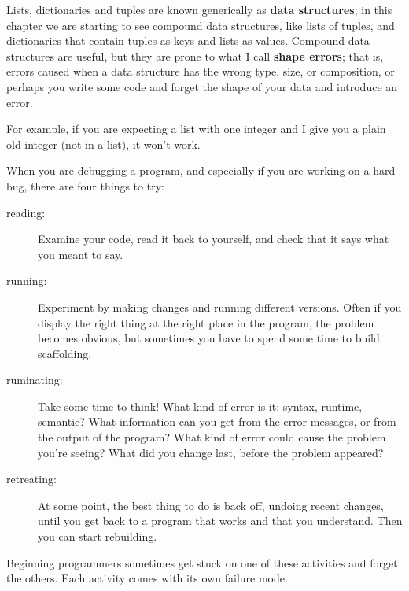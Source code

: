 
Lists, dictionaries and tuples are known generically as {\bf data
  structures}; in this chapter we are starting to see compound data
structures, like lists of tuples, and dictionaries that contain tuples
as keys and lists as values.  Compound data structures are useful, but
they are prone to what I call {\bf shape errors}; that is, errors
caused when a data structure has the wrong type, size, or composition,
or perhaps you write some code and forget the shape of your data
and introduce an error.

For example, if you are expecting a list with one integer and I
give you a plain old integer (not in a list), it won't work.

When you are debugging a program, and especially if you are
working on a hard bug, there are four things to try:

\begin{description}

\item[reading:] Examine your code, read it back to yourself, and
check that it says what you meant to say.

\item[running:] Experiment by making changes and running different
versions.  Often if you display the right thing at the right place
in the program, the problem becomes obvious, but sometimes you have to
spend some time to build scaffolding.

\item[ruminating:] Take some time to think!  What kind of error
is it: syntax, runtime, semantic?  What information can you get from
the error messages, or from the output of the program?  What kind of
error could cause the problem you're seeing?  What did you change
last, before the problem appeared?

\item[retreating:] At some point, the best thing to do is back
off, undoing recent changes, until you get back to a program that
works and that you understand.  Then you can start rebuilding.

\end{description}

Beginning programmers sometimes get stuck on one of these activities
and forget the others.  Each activity comes with its own failure
mode.


